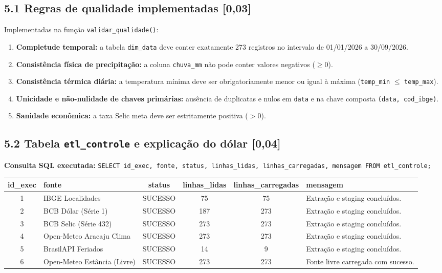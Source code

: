 \documentclass[11pt,a4paper]{article}
\begin{document}
\subsection*{5.1 Regras de qualidade implementadas \textnormal{[0,03]}}
Implementadas na função \texttt{validar\_qualidade()}:
\begin{enumerate}
    \item \textbf{Completude temporal:} a tabela \texttt{dim\_data} deve conter exatamente 273 registros no intervalo de 01/01/2026 a 30/09/2026.
    \item \textbf{Consistência física de precipitação:} a coluna \texttt{chuva\_mm} não pode conter valores negativos ($\ge 0$).
    \item \textbf{Consistência térmica diária:} a temperatura mínima deve ser obrigatoriamente menor ou igual à máxima (\texttt{temp\_min} $\le$ \texttt{temp\_max}).
    \item \textbf{Unicidade e não-nulidade de chaves primárias:} ausência de duplicatas e nulos em \texttt{data} e na chave composta \texttt{(data, cod\_ibge)}.
    \item \textbf{Sanidade econômica:} a taxa Selic meta deve ser estritamente positiva ($> 0$).
\end{enumerate}

\subsection*{5.2 Tabela \texttt{etl\_controle} e explicação do dólar \textnormal{[0,04]}}

\noindent\textbf{Consulta SQL executada:} \texttt{SELECT id\_exec, fonte, status, linhas\_lidas, linhas\_carregadas, mensagem FROM etl\_controle;}

\begin{table}[h!]
\centering
\footnotesize
\begin{tabularx}{\textwidth}{c p{4.2cm} c c c X}
\toprule
\textbf{id\_exec} & \textbf{fonte} & \textbf{status} & \textbf{linhas\_lidas} & \textbf{linhas\_carregadas} & \textbf{mensagem} \\
\midrule
1 & IBGE Localidades & SUCESSO & 75 & 75 & Extração e staging concluídos. \\
2 & BCB Dólar (Série 1) & SUCESSO & 187 & 273 & Extração e staging concluídos. \\
3 & BCB Selic (Série 432) & SUCESSO & 273 & 273 & Extração e staging concluídos. \\
4 & Open-Meteo Aracaju Clima & SUCESSO & 273 & 273 & Extração e staging concluídos. \\
5 & BrasilAPI Feriados & SUCESSO & 14 & 9 & Extração e staging concluídos. \\
6 & Open-Meteo Estância (Livre) & SUCESSO & 273 & 273 & Fonte livre carregada com sucesso. \\
\bottomrule
\end{tabularx}
\end{table}
\end{document}
